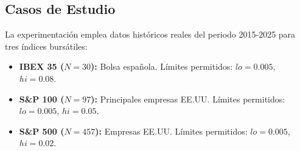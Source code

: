 \subsection{Casos de Estudio}
La experimentación emplea datos históricos reales del periodo 2015-2025 para tres índices bursátiles:
\begin{itemize}[noitemsep]
    \item \textbf{IBEX 35 ($N=30$):} Bolsa española. Límites permitidos: $lo=0.005$, $hi=0.08$.
    \item \textbf{S\&P 100 ($N=97$):} Principales empresas EE.UU. Límites permitidos: $lo=0.005$, $hi=0.05$.
    \item \textbf{S\&P 500 ($N=457$):} Empresas EE.UU. Límites permitidos: $lo=0.005$, $hi=0.02$.
\end{itemize}
